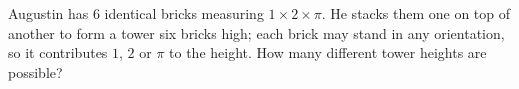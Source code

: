 Augustin has $6$ identical bricks measuring $1\times2\times\pi$. He stacks them one on top of another to form a tower six bricks high; each brick may stand in any orientation, so it contributes $1$, $2$ or $\pi$ to the height. How many different tower heights are possible?
